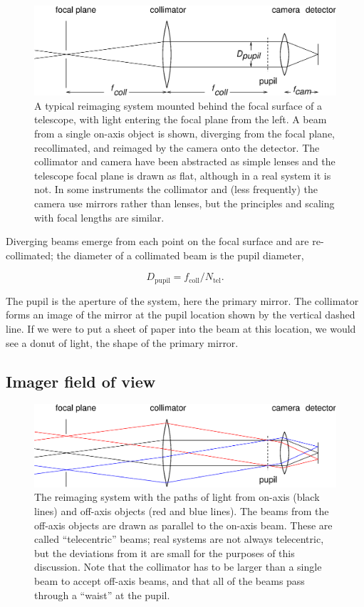 \documentclass[12pt]{article}
\newcommand{\subscript}[1]{\mathrm{#1}}
\newcommand{\tel}{\subscript{tel}}
\newcommand{\pupil}{\subscript{pupil}}
\newcommand{\coll}{\subscript{coll}}
\begin{document}
\begin{figure}[ht]
\centerline{
\includegraphics[width=5.5truein]{onaxisbeam2.eps}
}
\caption{A typical reimaging system mounted behind the
focal surface of a telescope, with light entering the
focal plane from the left.  A beam from a single on-axis
object is shown, diverging from the focal plane, recollimated,
and reimaged by the camera onto the detector.
The collimator and camera
have been abstracted as simple lenses and the telescope focal plane
is drawn as flat, although in a real system it is not.
In some instruments the collimator and (less frequently) the
camera use mirrors rather than lenses, but the principles
and scaling with focal lengths are similar.
}
\label{fig-reimager}
\end{figure}

Diverging beams emerge from each point on the focal surface
and are re-collimated; the diameter of a collimated beam is
the pupil diameter,

$$ D_{\pupil} = f_{\coll} / N_{\tel}.$$

The pupil is the aperture of the system, here the primary mirror.
The collimator forms an image of the mirror at the pupil location
shown by the vertical dashed line.  If we were to put a sheet
of paper into the beam at this location, we would see a donut
of light, the shape of the primary mirror.

\subsection{Imager field of view}

\begin{figure}[ht]
\centerline{
\includegraphics[width=5.5truein]{offaxisbeams.eps}
}
\caption{The reimaging system with the paths of light
from on-axis (black lines) and off-axis objects (red and blue lines).  The 
beams from the off-axis objects are drawn as parallel
to the on-axis beam.  These are called ``telecentric'' beams;
real systems are not always telecentric, but the deviations
from it are small for the purposes of this discussion.
Note that the collimator has to be larger than a single 
beam to accept off-axis beams, and that all of the beams
pass through a ``waist'' at the pupil.  
}
\label{fig-offaxis}
\end{figure}
\end{document}
